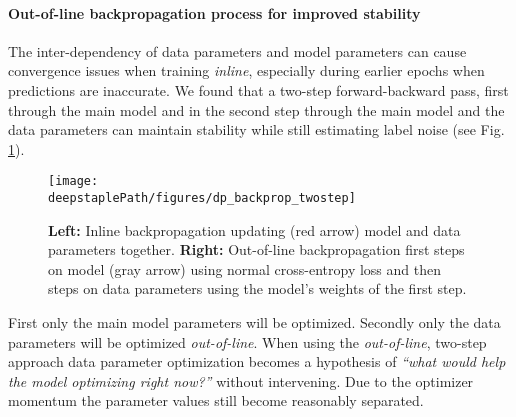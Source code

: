     \paragraph{\textbf{Out-of-line backpropagation process for improved stability}}
        \label{sec:ool_backprop}
        The inter-dependency of data parameters and model parameters can cause convergence issues when training \emph{inline}, especially during earlier epochs when predictions are inaccurate.
        We found that a two-step forward-backward pass, first through the main model and in the second step through the main model and the data parameters can maintain stability while still estimating label noise (see Fig. \ref{fig:ool_backprop}).
        \begin{figure}
            \centering
            \texttt{[image: \\deepstaplePath/figures/dp\_backprop\_twostep]}
            \caption{\textbf{Left:} Inline backpropagation updating (red arrow) model and data parameters together. \textbf{Right:} Out-of-line backpropagation first steps on model (gray arrow) using normal cross-entropy loss and then steps on data parameters using the model's weights of the first step.}
            \label{fig:ool_backprop}
        \end{figure}
        First only the main model parameters will be optimized. Secondly only the data parameters will be optimized \emph{out-of-line}.
        When using the \emph{out-of-line}, two-step approach data parameter optimization becomes a hypothesis of \emph{``what would help the model optimizing right now?''} without intervening. Due to the optimizer momentum the parameter values still become reasonably separated.

